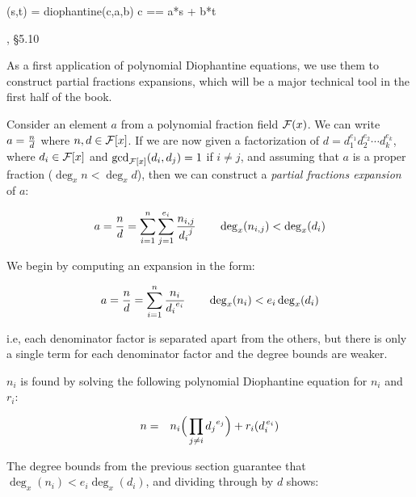 \begin{sageblock}
(s,t) = diophantine(c,a,b)
c == a*s + b*t
\end{sageblock}


\endexample

\vfill\eject

, \S5.10

As a first application of polynomial Diophantine equations, we use
them to construct partial fractions expansions, which will be
a major technical tool in the first half of the book.

Consider an element
$a$ from a polynomial fraction field ${\cal F}(x)$.  We can write
$a={n\over d}$ where $n,d\in{\cal F}[x]$.  If we are now given a
factorization of $d=d_1^{e_1} d_2^{e_2} \cdots d_k^{e_k}$, where
$d_i\in {\cal F}[x]$ and $\gcd_{{\cal F}[x]}(d_i,d_j)=1$ if $i\ne j$,
and assuming that $a$ is a proper fraction
($\deg_x n < \deg_x d$),
then we can construct a {\it partial fractions expansion} of $a$:

\begin{equation}
\label{partial fractions expansion}
a={n\over d}=\sum_{i=1}^{n}\sum_{j=1}^{e_i} {n_{i,j}\over {d_i}^j}
\qquad \deg_x (n_{i,j}) < \deg_x (d_i)
\end{equation}

We begin by computing an expansion in the form:

\begin{equation}
\label{partial fractions intermediate expansion}
a={n\over d}=\sum_{i=1}^{n} {n_i\over {d_i}^{e_i}}
\qquad \deg_x (n_i) < e_i\deg_x (d_i)
\end{equation}

i.e, each denominator factor is separated apart from the
others, but there is only a single term for each
denominator factor and the degree bounds are weaker.

$n_i$ is found by solving the following polynomial Diophantine
equation for $n_i$ and $r_i$:

\begin{eqnarray*}
n &=& n_i \Big( \prod_{j\ne i} {d_j}^{e_j} \Big) + r_i (d_i^{\,e_i}) \cr
\end{eqnarray*}

The degree bounds from the previous section guarantee that
$\deg_x (n_i) < e_i \deg_x (d_i)$, and dividing through by $d$ shows:

